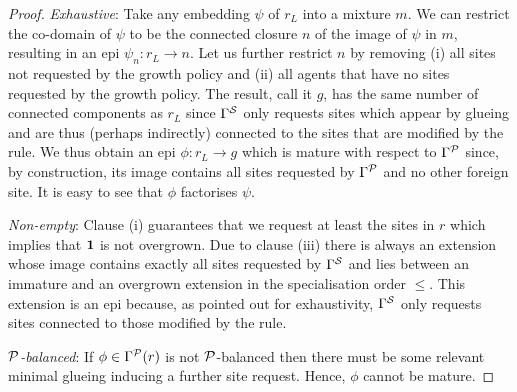 \begin{proof}
  \emph{Exhaustive}:
  Take any embedding $\psi$ of $r_L$ into a mixture $m$.
  We can restrict the co-domain of $\psi$ to be
  the connected closure $n$ of the image of $\psi$ in $m$,
  resulting in an epi $\psi_n: r_L \to n$.
  Let us further restrict $n$ by removing
  (i) all sites not requested by the growth policy and
  (ii) all agents that have no sites requested by the growth policy.
  The result, call it $g$,
  has the same number of connected components as $r_L$
  since $\Gamma^{\mathcal{S}}$ only requests sites
  which appear by glueing
  and are thus (perhaps indirectly) connected to the sites
  that are modified by the rule.
  We thus obtain an epi $\phi: r_L \to g$
  which is mature with respect to $\Gamma^{\mathcal{P}}$ since,
  by construction, its image contains all sites
  requested by $\Gamma^{\mathcal{P}}$ and no other foreign site.
  It is easy to see that $\phi$ factorises $\psi$.

  \emph{Non-empty}:
  Clause (i) guarantees that we request at least the sites in $r$
  which implies that $\boldsymbol{\mathbf{1}}$ is not overgrown.
  Due to clause (iii) there is always an extension
  whose image contains exactly all sites requested by $\Gamma^{\mathcal{S}}$
  and lies between an immature and an overgrown extension
  in the specialisation order $\leq$.
  This extension is an epi because,
  as pointed out for exhaustivity,
  $\Gamma^{\mathcal{S}}$ only requests sites
  connected to those modified by the rule.

  \emph{$\mathcal{P}$-balanced}:
  If $\phi \in \Gamma^{\mathcal{P}}(r)$ is not $\mathcal{P}$-balanced
  then there must be some relevant minimal glueing
  inducing a further site request.
  Hence, $\phi$ cannot be mature.


\end{proof}

